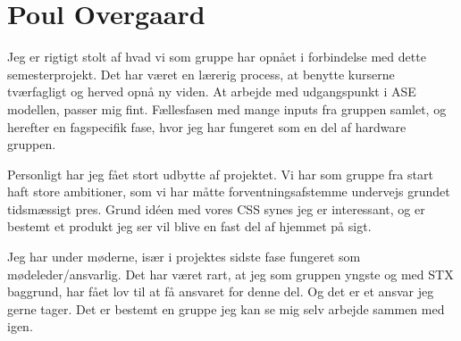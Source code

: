 \section{Poul Overgaard}
Jeg er rigtigt stolt af hvad vi som gruppe har opnået i forbindelse med dette semesterprojekt. Det har været en lærerig process, at benytte kurserne tværfagligt og herved opnå ny viden. At arbejde med udgangspunkt i ASE modellen, passer mig fint. Fællesfasen med mange inputs fra gruppen samlet, og herefter en fagspecifik fase, hvor jeg har fungeret som en del af hardware gruppen.  

Personligt har jeg fået stort udbytte af projektet. Vi har som gruppe fra start haft store ambitioner, som vi har måtte forventningsafstemme undervejs grundet tidsmæssigt pres. Grund idéen med vores CSS synes jeg er interessant, og er bestemt et produkt jeg ser vil blive en fast del af hjemmet på sigt.  

Jeg har under møderne, især i projektes sidste fase fungeret som mødeleder/ansvarlig. Det har været rart, at jeg som gruppen yngste og med STX baggrund, har fået lov til at få ansvaret for denne del. Og det er et ansvar jeg gerne tager. Det er bestemt en gruppe jeg kan se mig selv arbejde sammen med igen. 

























